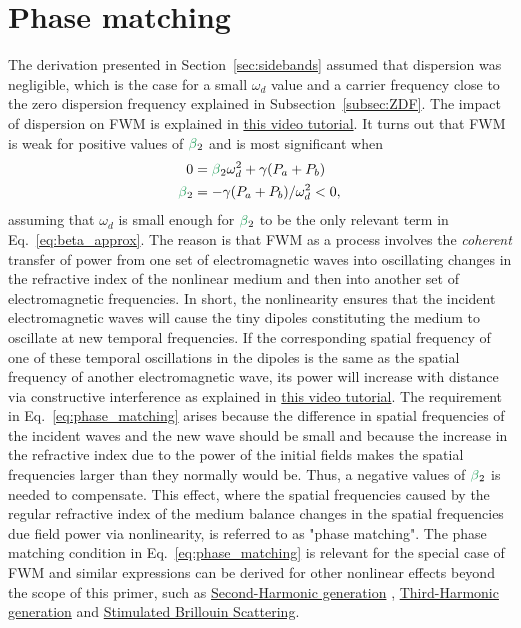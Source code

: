 \section{Phase matching}
\label{sec:Phase_matching}
The derivation presented in Section~\ref{sec:sidebands} assumed that dispersion was negligible, which is the case for a small $\omega_d$ value and a carrier frequency close to the zero dispersion frequency explained in Subsection~\ref{subsec:ZDF}. The impact of dispersion on FWM is explained in \href{https://youtu.be/0SXPvO89jto}{this video tutorial}. It turns out that FWM is weak for positive values of $\betag_2$ and is most significant when
\begin{align}
\label{eq:phase_matching}
0&=\betag_2\omega_d^2+\gamma(P_a+P_b)    \\ \nonumber
\betag_2&=-\gamma(P_a+P_b)/\omega_d^2<0,    
\end{align}
assuming that $\omega_d$ is small enough for $\betag_2$ to be the only relevant term in Eq.~\ref{eq:beta_approx}. The reason is that FWM as a process involves the \emph{coherent} transfer of power from one set of electromagnetic waves into oscillating changes in the refractive index of the nonlinear medium and then into another set of electromagnetic frequencies. In short, the nonlinearity ensures that the incident electromagnetic waves will cause the tiny dipoles constituting the medium to oscillate at new temporal frequencies. If the corresponding spatial frequency of one of these temporal oscillations in the dipoles is the same as the spatial frequency of another electromagnetic wave, its power will increase with distance via constructive interference as explained in \href{https://youtu.be/bha8SzWzRc4}{this video tutorial}. The requirement in Eq.~\ref{eq:phase_matching} arises because the difference in spatial frequencies of the incident waves and the new wave should be small and because the increase in the refractive index due to the power of the initial fields makes the spatial frequencies larger than they normally would be. Thus, a negative values of $\betag_2$ is needed to compensate. This effect, where the spatial frequencies caused by the regular refractive index of the medium balance changes in the spatial frequencies due field power via nonlinearity, is referred to as "phase matching". The phase matching condition in Eq.~\ref{eq:phase_matching} is relevant for the special case of FWM and similar expressions can be derived for other nonlinear effects beyond the scope of this primer, such as \href{https://www.youtube.com/watch?v=UpuN0dS23Nw}{Second-Harmonic generation} , \href{https://youtu.be/bha8SzWzRc4}{Third-Harmonic generation} and \href{https://www.creol.ucf.edu/mir/wp-content/uploads/sites/7/2023/07/L22_-Stimulated-Brillouin-scattering.pdf}{Stimulated Brillouin Scattering}.  

